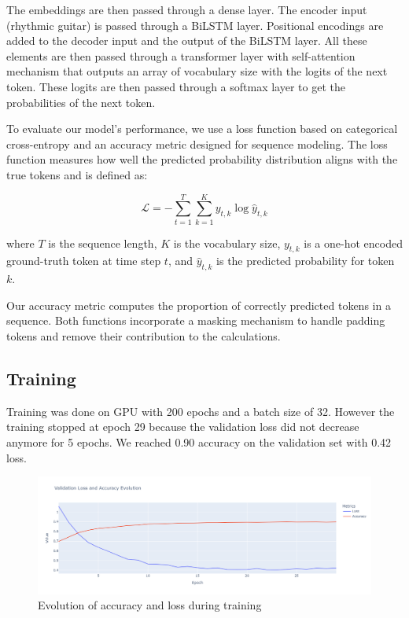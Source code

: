 The embeddings are then passed through a dense layer. The encoder input (rhythmic guitar) is passed through a BiLSTM layer.
Positional encodings are added to the decoder input and the output of the BiLSTM layer.
All these elements are then passed through a transformer layer with self-attention mechanism
that outputs an array of vocabulary size with the logits of the next token.
These logits are then passed through a softmax layer to get the probabilities of the next token.


To evaluate our model's performance, we use a loss function based on categorical cross-entropy and an accuracy metric designed for sequence modeling.
The loss function measures how well the predicted probability distribution aligns with the true tokens and is defined as:  

\[
\mathcal{L} = - \sum_{t=1}^{T} \sum_{k=1}^{K} y_{t,k} \log \hat{y}_{t,k}
\]

where \( T \) is the sequence length, \( K \) is the vocabulary size, \( y_{t,k} \) is a one-hot encoded ground-truth token at time step \( t \), and \( \hat{y}_{t,k} \) is the predicted probability for token \( k \).  

Our accuracy metric computes the proportion of correctly predicted tokens in a sequence.
Both functions incorporate a masking mechanism to handle padding tokens and remove their contribution to the calculations.


\subsection{Training}

Training was done on GPU with 200 epochs and a batch size of 32.
However the training stopped at epoch 29 because the validation loss did not decrease anymore for 5 epochs.
We reached 0.90 accuracy on the validation set with 0.42 loss.

\begin{figure}[!ht]
    \centering
    \includegraphics[width=.8\linewidth]{../images-figures/validation_acc_loss.png}
    \caption{Evolution of accuracy and loss during training}
    \label{fig:validation_acc_loss}
\end{figure}